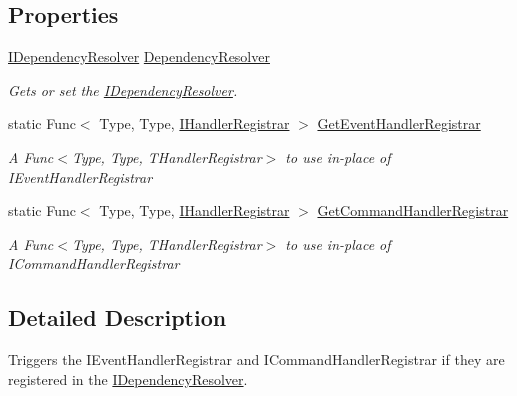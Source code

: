 \subsection*{Properties}
\begin{DoxyCompactItemize}
\item 
\hyperlink{interfaceCqrs_1_1Configuration_1_1IDependencyResolver}{I\+Dependency\+Resolver} \hyperlink{classCqrs_1_1Configuration_1_1BusRegistrar_aafccd565c2d9a748ff0f850a94100399_aafccd565c2d9a748ff0f850a94100399}{Dependency\+Resolver}
\begin{DoxyCompactList}\small\item\em Gets or set the \hyperlink{interfaceCqrs_1_1Configuration_1_1IDependencyResolver}{I\+Dependency\+Resolver}. \end{DoxyCompactList}\item 
static Func$<$ Type, Type, \hyperlink{interfaceCqrs_1_1Bus_1_1IHandlerRegistrar}{I\+Handler\+Registrar} $>$ \hyperlink{classCqrs_1_1Configuration_1_1BusRegistrar_adaab0236b3ce39214ce60b2272e5ab19_adaab0236b3ce39214ce60b2272e5ab19}{Get\+Event\+Handler\+Registrar}
\begin{DoxyCompactList}\small\item\em A Func$<$\+Type, Type, T\+Handler\+Registrar$>$ to use in-\/place of I\+Event\+Handler\+Registrar \end{DoxyCompactList}\item 
static Func$<$ Type, Type, \hyperlink{interfaceCqrs_1_1Bus_1_1IHandlerRegistrar}{I\+Handler\+Registrar} $>$ \hyperlink{classCqrs_1_1Configuration_1_1BusRegistrar_a5ac56d73af9d550c70ee722daed7dce8_a5ac56d73af9d550c70ee722daed7dce8}{Get\+Command\+Handler\+Registrar}
\begin{DoxyCompactList}\small\item\em A Func$<$\+Type, Type, T\+Handler\+Registrar$>$ to use in-\/place of I\+Command\+Handler\+Registrar \end{DoxyCompactList}\end{DoxyCompactItemize}


\subsection{Detailed Description}
Triggers the I\+Event\+Handler\+Registrar and I\+Command\+Handler\+Registrar if they are registered in the \hyperlink{interfaceCqrs_1_1Configuration_1_1IDependencyResolver}{I\+Dependency\+Resolver}. 



